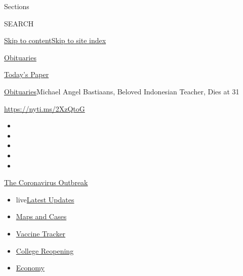 Sections

SEARCH

\protect\hyperlink{site-content}{Skip to
content}\protect\hyperlink{site-index}{Skip to site index}

\href{https://www.nytimes3xbfgragh.onion/section/obituaries}{Obituaries}

\href{https://myaccount.nytimes3xbfgragh.onion/auth/login?response_type=cookie\&client_id=vi}{}

\href{https://www.nytimes3xbfgragh.onion/section/todayspaper}{Today's
Paper}

\href{/section/obituaries}{Obituaries}\textbar{}Michael Angel Bastiaans,
Beloved Indonesian Teacher, Dies at 31

\url{https://nyti.ms/2XzQtoG}

\begin{itemize}
\item
\item
\item
\item
\item
\end{itemize}

\href{https://www.nytimes3xbfgragh.onion/news-event/coronavirus?action=click\&pgtype=Article\&state=default\&region=TOP_BANNER\&context=storylines_menu}{The
Coronavirus Outbreak}

\begin{itemize}
\tightlist
\item
  live\href{https://www.nytimes3xbfgragh.onion/2020/08/04/world/coronavirus-covid-19.html?action=click\&pgtype=Article\&state=default\&region=TOP_BANNER\&context=storylines_menu}{Latest
  Updates}
\item
  \href{https://www.nytimes3xbfgragh.onion/interactive/2020/us/coronavirus-us-cases.html?action=click\&pgtype=Article\&state=default\&region=TOP_BANNER\&context=storylines_menu}{Maps
  and Cases}
\item
  \href{https://www.nytimes3xbfgragh.onion/interactive/2020/science/coronavirus-vaccine-tracker.html?action=click\&pgtype=Article\&state=default\&region=TOP_BANNER\&context=storylines_menu}{Vaccine
  Tracker}
\item
  \href{https://www.nytimes3xbfgragh.onion/2020/08/02/us/covid-college-reopening.html?action=click\&pgtype=Article\&state=default\&region=TOP_BANNER\&context=storylines_menu}{College
  Reopening}
\item
  \href{https://www.nytimes3xbfgragh.onion/live/2020/08/03/business/stock-market-today-coronavirus?action=click\&pgtype=Article\&state=default\&region=TOP_BANNER\&context=storylines_menu}{Economy}
\end{itemize}

